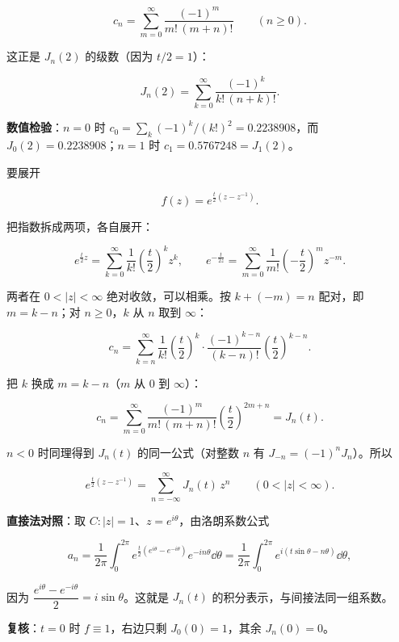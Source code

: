 \documentclass[11pt]{ctexart}
\let\origsubhdr\subhdr
\renewcommand{\subhdr}[1]{\par\needspace{4\baselineskip}\origsubhdr{#1}}
\let\orighdr\hdr
\renewcommand{\hdr}[2]{\par\needspace{9\baselineskip}\orighdr{#1}{#2}}
\begin{document}
\[ c_n=\sum_{m=0}^{\infty}\frac{(-1)^m}{m!\,(m+n)!}\qquad(n\ge0) . \]

这正是 $J_n(2)$ 的级数（因为 $t/2=1$）：

\[ J_n(2)=\sum_{k=0}^{\infty}\frac{(-1)^k}{k!\,(n+k)!} . \]

\textbf{数值检验}：$n=0$ 时 $c_0=\sum_k(-1)^k/(k!)^2=0.2238908$，而 $J_0(2)=0.2238908$；$n=1$ 时 $c_1=0.5767248=J_1(2)$。


要展开

\[ f(z)=e^{\frac t2\left(z-z^{-1}\right)} . \]

把指数拆成两项，各自展开：

\[ e^{\frac t2z}=\sum_{k=0}^{\infty}\frac{1}{k!}\left(\frac t2\right)^kz^k,\qquad e^{-\frac{t}{2z}}=\sum_{m=0}^{\infty}\frac{1}{m!}\left(-\frac t2\right)^mz^{-m} . \]

两者在 $0<|z|<\infty$ 绝对收敛，可以相乘。按 $k+(-m)=n$ 配对，即 $m=k-n$；对 $n\ge0$，$k$ 从 $n$ 取到 $\infty$：

\[ c_n=\sum_{k=n}^{\infty}\frac{1}{k!}\left(\frac t2\right)^k\cdot\frac{(-1)^{k-n}}{(k-n)!}\left(\frac t2\right)^{k-n} . \]

把 $k$ 换成 $m=k-n$（$m$ 从 $0$ 到 $\infty$）：

\[ c_n=\sum_{m=0}^{\infty}\frac{(-1)^m}{m!\,(m+n)!}\left(\frac t2\right)^{2m+n}=J_n(t) . \]

$n<0$ 时同理得到 $J_n(t)$ 的同一公式（对整数 $n$ 有 $J_{-n}=(-1)^nJ_n$）。所以

\[ e^{\frac t2\left(z-z^{-1}\right)}=\sum_{n=-\infty}^{\infty}J_n(t)\,z^n\qquad(0<|z|<\infty) . \]

\textbf{直接法对照}：取 $C:|z|=1$、$z=e^{i\theta}$，由洛朗系数公式

\[ a_n=\frac{1}{2\pi}\int_0^{2\pi}e^{\frac t2\left(e^{i\theta}-e^{-i\theta}\right)}e^{-in\theta}\dd\theta=\frac{1}{2\pi}\int_0^{2\pi}e^{i\left(t\sin\theta-n\theta\right)}\dd\theta , \]

因为 $\dfrac{e^{i\theta}-e^{-i\theta}}{2}=i\sin\theta$。这就是 $J_n(t)$ 的积分表示，与间接法同一组系数。

\textbf{复核}：$t=0$ 时 $f\equiv1$，右边只剩 $J_0(0)=1$，其余 $J_n(0)=0$。



\end{document}
